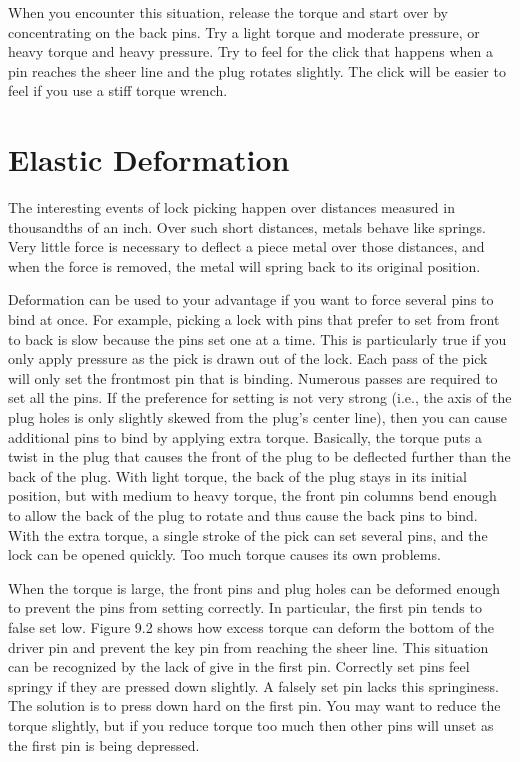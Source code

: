 When you encounter this situation, release the torque and start over by concentrating
on the back pins. Try a light torque and moderate pressure, or heavy torque and heavy
pressure. Try to feel for the click that happens when a pin reaches the sheer line and the
plug rotates slightly. The click will be easier to feel if you use a stiff torque wrench.

\section{Elastic Deformation}
The interesting events of lock picking happen over distances measured in thousandths of an
inch. Over such short distances, metals behave like springs. Very little force is necessary to deflect a piece metal over those distances, and when the force is removed, the metal will
spring back to its original position.

Deformation can be used to your advantage if you want to force several pins to bind at
once. For example, picking a lock with pins that prefer to set from front to back is slow
because the pins set one at a time. This is particularly true if you only apply pressure as
the pick is drawn out of the lock. Each pass of the pick will only set the frontmost pin that
is binding. Numerous passes are required to set all the pins. If the preference for setting is
not very strong (i.e., the axis of the plug holes is only slightly skewed from the plug's center
line), then you can cause additional pins to bind by applying extra torque. Basically, the
torque puts a twist in the plug that causes the front of the plug to be deflected further than
the back of the plug. With light torque, the back of the plug stays in its initial position, but
with medium to heavy torque, the front pin columns bend enough to allow the back of the
plug to rotate and thus cause the back pins to bind. With the extra torque, a single stroke
of the pick can set several pins, and the lock can be opened quickly. Too much torque causes
its own problems.

When the torque is large, the front pins and plug holes can be deformed enough to prevent
the pins from setting correctly. In particular, the first pin tends to false set low. Figure 9.2
shows how excess torque can deform the bottom of the driver pin and prevent the key pin
from reaching the sheer line. This situation can be recognized by the lack of give in the
first pin. Correctly set pins feel springy if they are pressed down slightly. A falsely set pin
lacks this springiness. The solution is to press down hard on the first pin. You may want to
reduce the torque slightly, but if you reduce torque too much then other pins will unset as
the first pin is being depressed.

